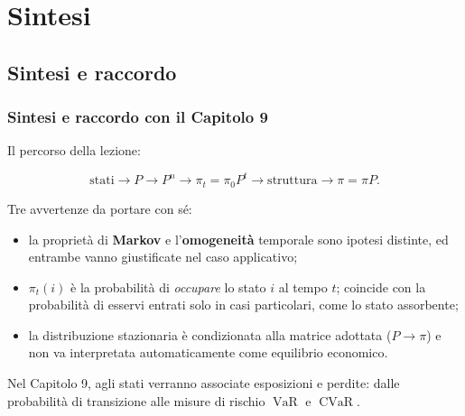 \documentclass[handout]{beamer}%
\newenvironment{stepitemize}{\begin{itemize}[<+->]}{\end{itemize} }
\providecommand{\VaR}{\operatorname{VaR}}
\providecommand{\CVaR}{\operatorname{CVaR}}
\providecommand{\QTR}[2]{\csname #1\endcsname{#2}}
\begin{document}


\section{Sintesi}

\subsection{Sintesi e raccordo}%

\begin{frame}%
%

\frametitle{Sintesi e raccordo con il Capitolo 9}%
%

%


Il percorso della lezione:%

\[
\text{stati} \longrightarrow P \longrightarrow P^{n} \longrightarrow\pi
_{t}=\pi_{0}P^{t} \longrightarrow\text{struttura} \longrightarrow\pi=\pi P.
\]


\medskip

Tre avvertenze da portare con s\'{e}:

\begin{stepitemize}
\item la propriet\`{a} di \textbf{Markov} e l'\textbf{omogeneit\`{a}}
temporale sono ipotesi distinte, ed entrambe vanno giustificate nel caso applicativo;

\item $\pi_{t}(i)$ \`{e} la probabilit\`{a} di \emph{occupare} lo stato $i$ al
tempo $t$; coincide con la probabilit\`{a} di esservi entrati solo in casi
particolari, come lo stato assorbente;

\item la distribuzione stazionaria \`{e} condizionata alla matrice adottata
($P\longrightarrow\pi$) e non va interpretata automaticamente come equilibrio economico.
\end{stepitemize}

\medskip

\begin{center}
{\small Nel Capitolo 9, agli stati verranno associate esposizioni e perdite:
dalle probabilit\`{a} di transizione alle misure di rischio $\VaR$ e $\CVaR$.}
\end{center}%

\transboxout
\end{frame}%
\end{document}

